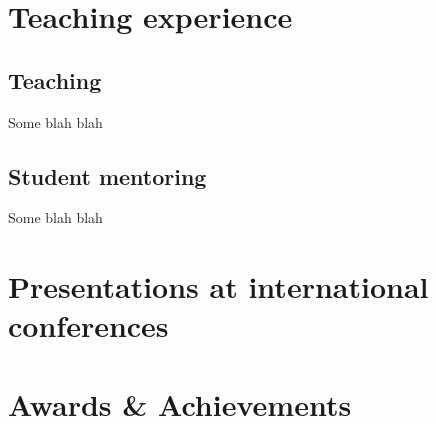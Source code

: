 \documentclass[11pt,a4paper,]{awesome-cv}
\begin{document}
\hypertarget{teaching-experience}{%
\section{Teaching experience}\label{teaching-experience}}

\hypertarget{teaching}{%
\subsection{Teaching}\label{teaching}}

Some blah blah

\begin{cvhonors}
\end{cvhonors}

\hypertarget{student-mentoring}{%
\subsection{Student mentoring}\label{student-mentoring}}

Some blah blah

\begin{cvhonors}
\end{cvhonors}

\hypertarget{presentations-at-international-conferences}{%
\section{Presentations at international
conferences}\label{presentations-at-international-conferences}}

\begin{cvhonors}
\end{cvhonors}

\hypertarget{awards-achievements}{%
\section{Awards \& Achievements}\label{awards-achievements}}
\end{document}
